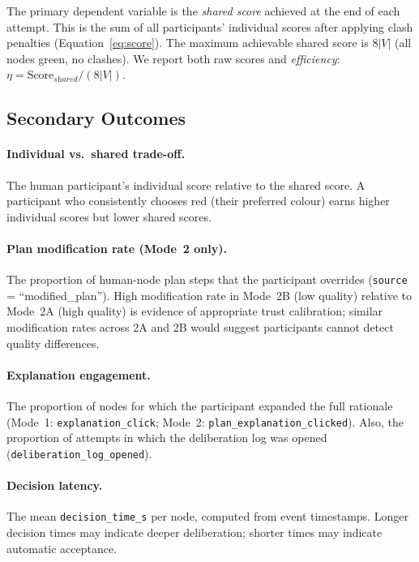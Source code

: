 \documentclass[11pt]{article}
\theoremstyle{definition}
\newcommand{\Shared}{\textit{shared}}
\begin{document}
The primary dependent variable is the \emph{shared score} achieved at the end of each
attempt.  This is the sum of all participants' individual scores after applying clash
penalties (Equation~\ref{eq:score}).  The maximum achievable shared score is $8|V|$
(all nodes green, no clashes).  We report both raw scores and \emph{efficiency}:
$\eta = \text{Score}_\Shared / (8|V|)$.

\subsection{Secondary Outcomes}

\paragraph{Individual vs.\ shared trade-off.}
The human participant's individual score relative to the shared score.  A participant who
consistently chooses red (their preferred colour) earns higher individual scores but lower
shared scores.

\paragraph{Plan modification rate (Mode~2 only).}
The proportion of human-node plan steps that the participant overrides
(\texttt{source} = ``modified\_plan'').  High modification rate in Mode~2B (low quality)
relative to Mode~2A (high quality) is evidence of appropriate trust calibration; similar
modification rates across 2A and 2B would suggest participants cannot detect quality
differences.

\paragraph{Explanation engagement.}
The proportion of nodes for which the participant expanded the full rationale (Mode~1:
\texttt{explanation\_click}; Mode~2: \texttt{plan\_explanation\_clicked}).  Also, the
proportion of attempts in which the deliberation log was opened
(\texttt{deliberation\_log\_opened}).

\paragraph{Decision latency.}
The mean \texttt{decision\_time\_s} per node, computed from event timestamps.  Longer
decision times may indicate deeper deliberation; shorter times may indicate automatic
acceptance.
\end{document}
